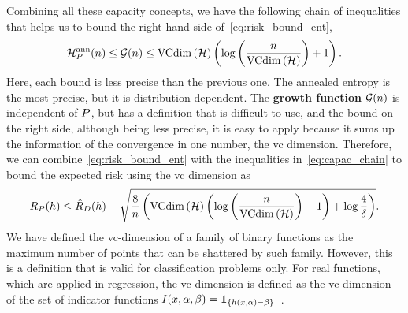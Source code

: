 %
Combining all these capacity concepts, we have the following chain of inequalities that helps us to bound the right-hand side of~\eqref{eq:risk_bound_ent},
\begin{equation}
    \label{eq:capac_chain}
    \mathcal{H}^{\text{ann}}_{\distf}(\nsamples) \leq \mathcal{G}(\nsamples) \leq \vcdim{\hypspace} \left(\log\left(\frac{\nsamples}{\vcdim{\hypspace}}\right) + 1 \right).
\end{equation}
Here, each bound is less precise than the previous one. The annealed entropy is the most precise, but it is distribution dependent. The \textbf{growth function} $\mathcal{G}(n)$ is independent of $P$, but has a definition that is difficult to use, and the bound on the right side, although being less precise, it is easy to apply because it sums up the information of the convergence in one number, the \acrshort{vc} dimension.
%
Therefore, we can combine~\eqref{eq:risk_bound_ent} with the inequalities in~\eqref{eq:capac_chain} to bound the expected risk using the \acrshort{vc} dimension as
\begin{equation}
    \label{eq:risk_bound_vc}
    \exprisk(\hypf) \leq \emprisk(\hypf) + \sqrt{\frac{8}{\nsamples} \left(\vcdim{\hypspace} \left(\log\left(\frac{\nsamples}{\vcdim{\hypspace}}\right) + 1 \right) + \log \frac{4}{\delta} \right)} .
\end{equation}
%
We have defined the \acrshort{vc}-dimension of a family of binary functions as the maximum number of points that can be shattered by such family. However, this is a definition that is valid for classification problems only. For real functions, which are applied in regression, the \acrshort{vc}-dimension is defined as the \acrshort{vc}-dimension of the set of indicator functions $ I(x, \alpha, \beta) = \bm{1}_{\{h\left(x, \alpha\right) - \beta\}}$~\citep{vapnik1982estimation}.


